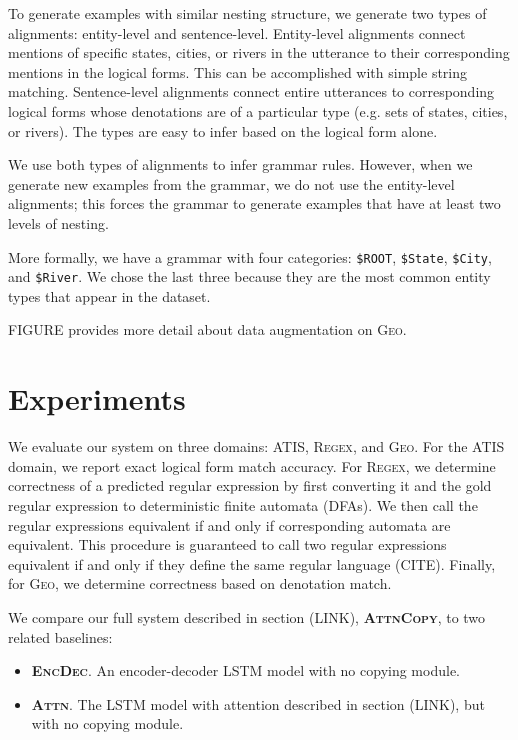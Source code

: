 \documentclass[11pt,letterpaper]{article}
\newcommand{\encdec}{\textsc{EncDec}\xspace}
\newcommand{\attn}{\textsc{Attn}\xspace}
\newcommand{\attncopy}{\textsc{AttnCopy}\xspace}
\newcommand{\atis}{\textsc{ATIS}\xspace}
\newcommand{\regex}{\textsc{Regex}\xspace}
\newcommand{\geo}{\textsc{Geo}\xspace}
\begin{document}
To generate examples with similar nesting structure,
we generate two types of alignments: entity-level and sentence-level.
Entity-level alignments connect mentions of specific states, cities, or rivers
in the utterance to their corresponding mentions in the logical forms.
This can be accomplished with simple string matching.
Sentence-level alignments connect entire utterances to 
corresponding logical forms whose denotations are of a particular 
type (e.g. sets of states, cities, or rivers).
The types are easy to infer based on the logical form alone.

We use both types of alignments to infer grammar rules.
However, when we generate new examples from the grammar,
we do not use the entity-level alignments;
this forces the grammar to generate examples that have 
at least two levels of nesting.

More formally, we have a grammar with four categories:
\texttt{\$ROOT}, \texttt{\$State}, \texttt{\$City}, and \texttt{\$River}.
We chose the last three because they are the most common entity types
that appear in the dataset.  

FIGURE provides more detail about data augmentation on \geo.

\section{Experiments}
We evaluate our system on three domains: \atis, \regex, and \geo.
For the \atis domain, we report exact logical form match accuracy.
For \regex, we determine correctness of a predicted regular expression
by first converting it and the gold regular expression to
deterministic finite automata (DFAs).  We then call the regular expressions
equivalent if and only if corresponding automata are equivalent.
This procedure is guaranteed to call two regular expressions equivalent
if and only if they define the same regular language (CITE).
Finally, for \geo, we determine correctness based on denotation match.

We compare our full system described in section (LINK), \textbf{\attncopy}, 
to two related baselines:
\begin{itemize}
  \item \textbf{\encdec}.  An encoder-decoder LSTM model with no copying module.
  \item \textbf{\attn}.  The LSTM model with attention described in section (LINK),
     but with no copying module.
\end{itemize}
\end{document}
